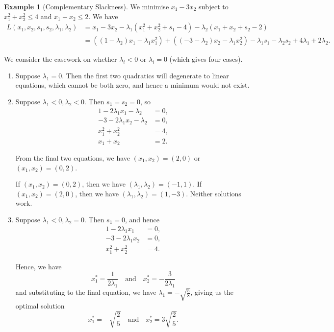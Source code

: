 \documentclass[11pt]{article}
\theoremstyle{definition}
\newtheorem{example}[theorem]{Example}
\theoremstyle{remark}
\newcommand{\pqty}[1]{\left(#1\right)}
\newcommand{\flatfrac}[2]{\frac{#1}{#2}}
\newcommand{\qand}{\quad\text{and}\quad}
\begin{document}
\begin{example}[Complementary Slackness]\label{optim-unit-0029}
    We minimise \(x_1 - 3 x_2\) subject to \(x_1^2 + x_2^2 \leq 4\) and \(x_1 + x_2 \leq 2\). We have
    \begin{align*}
        L\pqty{x_1, x_2, s_1, s_2, \lambda_1, \lambda_2} &= x_1 - 3 x_2 - \lambda_1 \pqty{x_1^2 + x_2^2 + s_1 - 4} - \lambda_2 \pqty{x_1 + x_2 + s_2 - 2} \\
        &= \pqty{\pqty{1 - \lambda_2} x_1 - \lambda_1 x_1^2} + \pqty{\pqty{-3 - \lambda_2} x_2 - \lambda_1 x_2^2} - \lambda_1 s_1 - \lambda_2 s_2 + 4 \lambda_1 + 2 \lambda_2.
    \end{align*}

    We consider the casework on whether \(\lambda_i < 0\) or \(\lambda_i = 0 \) (which gives four cases).

    \begin{enumerate}
        \item Suppose \(\lambda_1 = 0\). Then the first two quadratics will degenerate to linear equations, which cannot be both zero, and hence a minimum would not exist.
        \item Suppose \(\lambda_1 < 0, \lambda_2 < 0\). Then \(s_1 = s_2 = 0\), so
        \begin{align*}
            1 - 2 \lambda_1 x_1 - \lambda_2 &= 0, \\
            -3 - 2 \lambda_1 x_2 - \lambda_2 &= 0, \\
            x_1^2 + x_2^2 &= 4, \\
            x_1 + x_2 &= 2.
        \end{align*}

        From the final two equations, we have \(\pqty{x_1, x_2} = \pqty{2, 0}\) or \(\pqty{x_1, x_2} = \pqty{0, 2}\).
        
        If \(\pqty{x_1, x_2} = \pqty{0, 2}\), then we have \(\pqty{\lambda_1, \lambda_2} = \pqty{-1, 1}\). If \(\pqty{x_1, x_2} = \pqty{2, 0}\), then we have \(\pqty{\lambda_1, \lambda_2} = \pqty{1, -3}\). Neither solutions work.

        \item Suppose \(\lambda_1 < 0, \lambda_2 = 0\). Then \(s_1 = 0\), and hence
        \begin{align*}
            1 - 2 \lambda_1 x_1 &= 0, \\
            -3 - 2 \lambda_1 x_2 &= 0, \\
            x_1^2 + x_2^2 &= 4.
        \end{align*}

        Hence, we have
        \[
            x_1^{\ast} = \frac{1}{2 \lambda_1} \qand x_2^{\ast} = - \frac{3}{2 \lambda_1}
        \]
        and substituting to the final equation, we have \(\lambda_1 = - \sqrt{\flatfrac{5}{8}}\), giving us the optimal solution
        \[
            x_1^{\ast} = - \sqrt{\frac{2}{5}} \qand x_2^{\ast} = 3 \sqrt{\frac{2}{5}}.
        \]
    \end{enumerate}
\end{example}
\end{document}

